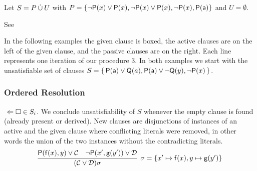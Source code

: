 \begin{example}

	Let \( S = P \mathbin{\dot\cup} U \)
	with \( P = \{
		\lnot \mathsf{P}(x)\lor\mathsf{P}(x),
		\lnot \mathsf{P}(x)\lor\mathsf{P}(x),
		\lnot \mathsf{P}(x),
		\mathsf{P}(\mathsf{a}) \}
	\)
	and \( U = \emptyset \).


\end{example}

\begin{definition}
	See~\cite{DBLP:conf/cade/SchulzM16, DBLP:conf/cade/2016}
\end{definition}



In the following examples the given clause is boxed,
the active clauses are on the left of the given clause,
and the passive clauses are on the right.
Each line represents one iteration of our procedure 3.
%
In both examples we start with the unsatisfiable set of clauses
\( S=\{ \, \mathsf{P}(\mathsf{a})\lor\mathsf{Q}(a), \mathsf{P}(\mathsf{a})\lor\lnot\mathsf{Q}(y), \lnot\mathsf{P}(x) \, \} \).

\subsubsection{Ordered Resolution}

\jek{} \( \ \Leftarrow\square\in S_i \). We conclude unsatisfiability of \( S \) whenever the empty clause is found (already present or derived).
New clauses are disjunctions of instances of an active and the given clause where conflicting literals were removed,
in other words the union of the two instances without the contradicting literals.
\begin{gather*}
\infer[\sigma=\{ x'\mapsto\mf(x), y\mapsto\mg(y') \}]{
	(\mcC \lor \mcD)\sigma
}{
	\mP(\mf(x), y) \lor \mcC & \lnot\mP(x',\mg(y')) \lor \mcD
}
\end{gather*}

